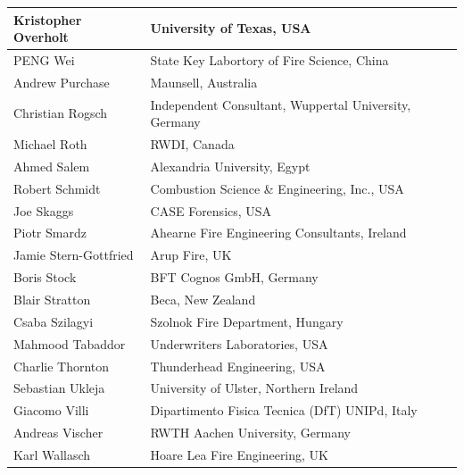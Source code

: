 \documentclass[11pt]{book}
\begin{document}
\begin{longtable}{|l|l|}
Kristopher Overholt                     & University of Texas, USA                  \\ \hline
PENG Wei                                & State Key Labortory of Fire Science, China                  \\ \hline
Andrew Purchase                         & Maunsell, Australia                  \\ \hline
Christian Rogsch                        & Independent Consultant, Wuppertal University, Germany                  \\ \hline
Michael Roth                            & RWDI, Canada                  \\ \hline
Ahmed Salem                             & Alexandria University, Egypt                                             \\ \hline
Robert Schmidt                          & Combustion Science \& Engineering, Inc., USA                  \\ \hline
Joe Skaggs                              & CASE Forensics, USA                  \\ \hline
Piotr Smardz                            & Ahearne Fire Engineering Consultants, Ireland                  \\ \hline
Jamie Stern-Gottfried                   & Arup Fire, UK                 \\ \hline
Boris Stock                             & BFT Cognos GmbH, Germany                  \\ \hline
Blair Stratton                          & Beca, New Zealand                   \\ \hline
Csaba Szilagyi                          & Szolnok Fire Department, Hungary                  \\ \hline
Mahmood Tabaddor                        & Underwriters Laboratories, USA                  \\ \hline
Charlie Thornton                        & Thunderhead Engineering, USA                  \\ \hline
Sebastian Ukleja                        & University of Ulster, Northern Ireland                  \\ \hline
Giacomo Villi                           & Dipartimento Fisica Tecnica (DfT) UNIPd, Italy                  \\ \hline
Andreas Vischer                         & RWTH Aachen University, Germany                  \\ \hline
Karl Wallasch                           & Hoare Lea Fire Engineering, UK                  \\ \hline

\end{longtable}
\end{document}
